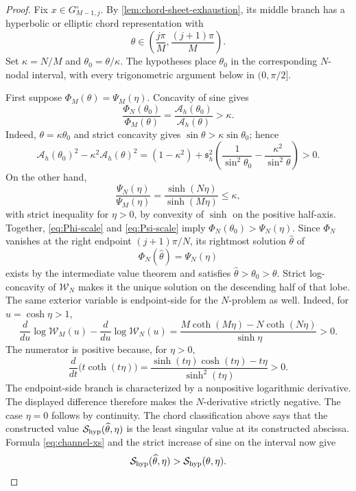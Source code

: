 \documentclass[preprints,article,accept,oneauthor]{Definitions/mdpi}
\numberwithin{equation}{section}
\theoremstyle{mdpi}
\theoremstyle{definition}
\begin{document}
\begin{proof}
Fix \(x\in G_{M-1,j}^{\circ}\).  By
\cref{lem:chord-sheet-exhaustion}, its middle branch has a hyperbolic or
elliptic chord representation with
\[
 \theta\in\left(\frac{j\pi}{M},\frac{(j+1)\pi}{M}\right).
\]
Set \(\kappa=N/M\) and \(\theta_0=\theta/\kappa\).  The hypotheses place
\(\theta_0\) in the corresponding \(N\)-nodal interval, with every
trigonometric argument below in \((0,\pi/2]\).

First suppose \(\Phi_M(\theta)=\Psi_M(\eta)\).  Concavity of sine gives
\begin{equation}\label{eq:Phi-scale}
 \frac{\Phi_N(\theta_0)}{\Phi_M(\theta)}
 =\frac{\mathcal A_h(\theta_0)}{\mathcal A_h(\theta)}>\kappa.
\end{equation}
Indeed, \(\theta=\kappa\theta_0\) and strict concavity gives
\(\sin\theta>\kappa\sin\theta_0\); hence
\[
 \mathcal A_h(\theta_0)^2-\kappa^2\mathcal A_h(\theta)^2
 =(1-\kappa^2)+\mathfrak s_h^2\left(
 \frac1{\sin^2\theta_0}-\frac{\kappa^2}{\sin^2\theta}
 \right)>0.
\]
On the other hand,
\begin{equation}\label{eq:Psi-scale}
 \frac{\Psi_N(\eta)}{\Psi_M(\eta)}
 =\frac{\sinh(N\eta)}{\sinh(M\eta)}\leq\kappa,
\end{equation}
with strict inequality for \(\eta>0\), by convexity of \(\sinh\) on
the positive half-axis.  Together, \eqref{eq:Phi-scale} and
\eqref{eq:Psi-scale} imply
\(\Phi_N(\theta_0)>\Psi_N(\eta)\).  Since \(\Phi_N\) vanishes at the right
endpoint \((j+1)\pi/N\), its rightmost solution
\(\widehat\theta\) of
\[
 \Phi_N(\widehat\theta)=\Psi_N(\eta)
\]
exists by the intermediate value theorem and satisfies
\(\widehat\theta>\theta_0>\theta\).  Strict log-concavity of
\(\mathcal W_N\) makes it the unique solution on the descending half
of that lobe.  The same exterior
variable is endpoint-side for the \(N\)-problem as well.  Indeed, for
\(u=\cosh\eta>1\),
\[
 \frac{d}{du}\log\mathcal W_M(u)-
 \frac{d}{du}\log\mathcal W_N(u)
 =\frac{M\coth(M\eta)-N\coth(N\eta)}{\sinh\eta}>0.
\]
The numerator is positive because, for \(\eta>0\),
\[
 \frac{d}{dt}\bigl(t\coth(t\eta)\bigr)
 =\frac{\sinh(t\eta)\cosh(t\eta)-t\eta}{\sinh^2(t\eta)}>0.
\]
The endpoint-side branch is characterized by a nonpositive logarithmic
derivative.  The displayed difference therefore makes the
\(N\)-derivative strictly negative.  The case \(\eta=0\) follows by
continuity.
The chord classification above says that the constructed value
\(\mathcal S_{\rm hyp}(\widehat\theta,\eta)\) is the least singular
value at its constructed abscissa.  Formula
\eqref{eq:channel-xs} and the strict increase of sine on the interval
now give
\begin{equation}\label{eq:hyper-height-increase}
 \mathcal S_{\rm hyp}(\widehat\theta,\eta)
 >\mathcal S_{\rm hyp}(\theta,\eta).
\end{equation}


\end{proof}
\end{document}
